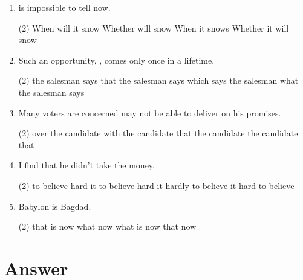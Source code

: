\begin{enumerate}
\item \ttu is impossible to tell now.
\begin{tasks}(2)
  \task When will it snow
  \task Whether will snow
  \task When it snows
  \task Whether it will snow
\end{tasks}

\item Such an opportunity, \ttu, comes only once in a lifetime.
\begin{tasks}(2)
  \task the salesman says
  \task that the salesman says
  \task which says the salesman
  \task what the salesman says
\end{tasks}

\item Many voters are concerned \ttu may not be able to deliver on his promises.
\begin{tasks}(2)
  \task over the candidate
  \task with the candidate
  \task that the candidate
  \task the candidate that
\end{tasks}

\item I find \ttu that he didn't take the money.
\begin{tasks}(2)
  \task to believe hard
  \task it to believe hard
  \task it hardly to believe
  \task it hard to believe
\end{tasks}

\item Babylon is \ttu Bagdad.
\begin{tasks}(2)
  \task that is now
  \task what now
  \task what is now
  \task that now
\end{tasks}

\end{enumerate}

\section{Answer}

